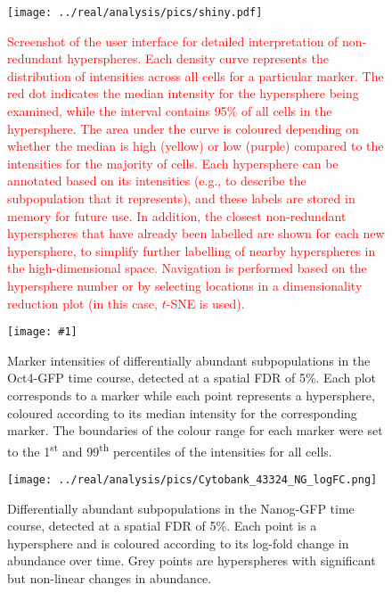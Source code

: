 \documentclass{article}
\newcommand\revised[1]{\textcolor{red}{#1}}
\begin{document}
\begin{figure}[tbp]
    \begin{center}
        \texttt{[image: ../real/analysis/pics/shiny.pdf]}
    \end{center}
    \caption{\revised{Screenshot of the user interface for detailed interpretation of non-redundant hyperspheres.
            Each density curve represents the distribution of intensities across all cells for a particular marker.
            The red dot indicates the median intensity for the hypersphere being examined, while the interval contains 95\% of all cells in the hypersphere.
            The area under the curve is coloured depending on whether the median is high (yellow) or low (purple) compared to the intensities for the majority of cells.
            Each hypersphere can be annotated based on its intensities (e.g., to describe the subpopulation that it represents), and these labels are stored in memory for future use.
            In addition, the closest non-redundant hyperspheres that have already been labelled are shown for each new hypersphere, to simplify further labelling of nearby hyperspheres in the high-dimensional space.
            Navigation is performed based on the hypersphere number or by selecting locations in a dimensionality reduction plot (in this case, $t$-SNE is used).
        }
}
\label{fig:shiny}
\end{figure}

\clearpage
\newcommand{\bigfigopt}[1]{\texttt{[image: \#1]}}

\begin{figure}[p]
    \begin{center}
    \bigfigopt{../real/analysis/pics/Cytobank_43324_4FI_markers.png}
    \end{center}
    \caption{
        Marker intensities of differentially abundant subpopulations in the Oct4-GFP time course, detected at a spatial FDR of 5\%.
        Each plot corresponds to a marker while each point represents a hypersphere, coloured according to its median intensity for the corresponding marker.
        The boundaries of the colour range for each marker were set to the 1\textsuperscript{st} and 99\textsuperscript{th} percentiles of the intensities for all cells.
    }
    \label{fig:oct4_markers}
\end{figure}

\begin{figure}[p]
    \begin{center}
    \texttt{[image: ../real/analysis/pics/Cytobank\_43324\_NG\_logFC.png]}
    \end{center}
    \caption{
        Differentially abundant subpopulations in the Nanog-GFP time course, detected at a spatial FDR of 5\%.
        Each point is a hypersphere and is coloured according to its log-fold change in abundance over time.
        Grey points are hyperspheres with significant but non-linear changes in abundance.
    }
\end{figure}
\end{document}

